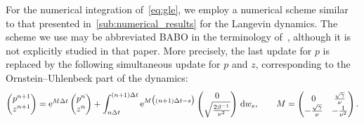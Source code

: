 \documentclass[11pt,a4paper]{article}
\begin{document}
For the numerical integration of~\eqref{eq:gle},
we employ a numerical scheme similar to that presented in~\cref{sub:numerical_results} for the Langevin dynamics.
The scheme we use may be abbreviated BABO in the terminology of~\cite{MR4379630},
although it is not explicitly studied in that paper.
More precisely, the last update for $p$ is replaced by the following simultaneous update for $p$ and $z$,
corresponding to the Ornstein--Uhlenbeck part of the dynamics:
\[
    \begin{pmatrix}
        p^{n+1} \\
        z^{n+1}
    \end{pmatrix}
    =
    \mathrm{e}^{M \Delta t}
    \begin{pmatrix}
        p^{n} \\
        z^{n}
    \end{pmatrix}
    + \int_{n \Delta t}^{(n+1)\Delta t} \mathrm{e}^{M \bigl((n+1) \Delta t - s\bigr)}
    \begin{pmatrix}
        0 \\
        \sqrt{\frac{2 \beta^{-1}}{\nu^2}}
    \end{pmatrix}
    \, \mathrm d w_s,
    \qquad M =
    \begin{pmatrix}
        0 & \frac{\sqrt{\gamma}}{\nu} \\
        - \frac{\sqrt{\gamma}}{\nu} & -   \frac{1}{\nu^2}
    \end{pmatrix}.
\]
\end{document}
